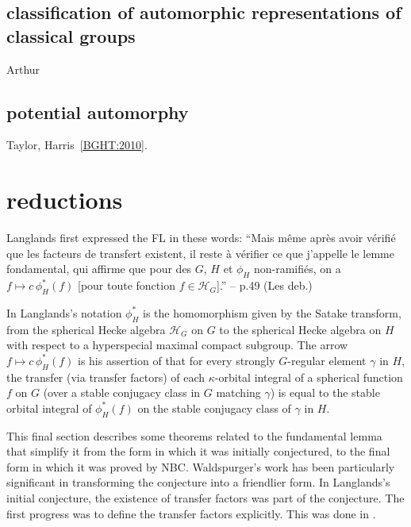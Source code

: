 \documentclass[brochure,english,12pt]{bourbaki}
\begin{document}

\subsection{classification of automorphic representations of classical groups}

Arthur~\cite{Arthur:2011}

\subsection{potential automorphy}

Taylor, Harris~\ref{BGHT:2010}.






\section{reductions}\label{sec:reduce}

Langlands first expressed the FL in these words:
``Mais m\^eme apr\`es avoir
v\'erifi\'e que les facteurs de
transfert existent, il reste \`a v\'erifier ce que j'appelle le
lemme fondamental, qui affirme que pour des $G$, $H$ et $\phi_H$
non-ramifi\'es, on a $f\mapsto c\, \phi_H^*(f)$ [pour toute fonction $f\in {\mathcal H}_G$].''
 -- p.49 (Les deb.)  \cite[p.49]{Langlands:debuts}

In Langlands's notation $\phi_H^*$ is the homomorphism given by the
Satake transform, from the spherical Hecke algebra ${\mathcal H}_G$ on
$G$ to the spherical Hecke algebra on $H$ with respect to a hyperspecial maximal compact
subgroup.  The arrow $f\mapsto
c\,\phi_H^*(f)$ is his assertion of that for every strongly $G$-regular element $\gamma$
in $H$, the transfer (via transfer factors) of each $\kappa$-orbital integral
of a spherical function $f$ on $G$ (over a stable conjugacy class in $G$ matching $\gamma$) is
equal to the stable orbital integral of $\phi_H^*(f)$ on the stable conjugacy class of $\gamma$ in $H$.

This final section describes some theorems related to the fundamental
lemma that simplify it from the form in which it was initially
conjectured, to the final form in which it was proved by NBC.
Waldspurger's work has been particularly significant in transforming the conjecture into a 
friendlier form.  In Langlands's
initial conjecture, the existence of transfer factors was part of the conjecture.
The first progress was to define the transfer factors explicitly.  
This was done in \cite{LS:1987}.
\end{document}
